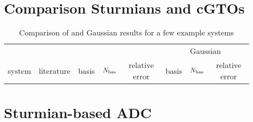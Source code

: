 \section{Comparison Sturmians and cGTOs}

\begin{table}
	\centering
	\begin{tabular}{lc|ccc|ccc}
		       &            & \multicolumn{3}{c}{\CS}     & \multicolumn{3}{c}{Gaussian} \\
		system & literature & basis & $N_\text{bas}$ & relative error & basis & $N_\text{bas}$ & relative error \\
	\end{tabular}
	\caption{Comparison of \CS and Gaussian results for a few example systems}
	\label{tab:CSvsGaussian}
\end{table}





\section{Sturmian-based ADC}

%

